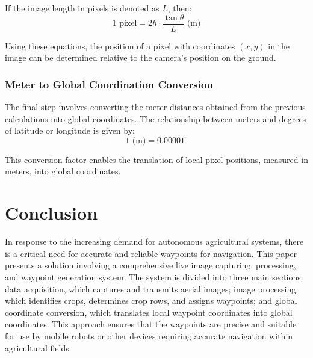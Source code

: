 \documentclass[conference]{IEEEtran}
\begin{document}
If the image length in pixels is denoted as \( L \), then:
\[
1 \text{ pixel} = 2h \cdot \frac{\tan \theta}{L} \text{ (m)}
\]

Using these equations, the position of a pixel with coordinates \((x, y)\) in the image can be determined relative to the camera's position on the ground.

\subsubsection{Meter to Global Coordination Conversion}
The final step involves converting the meter distances obtained from the previous calculations into global coordinates. The relationship between meters and degrees of latitude or longitude is given by:
\[
1 \text{ (m)} = 0.00001^\circ
\]

This conversion factor enables the translation of local pixel positions, measured in meters, into global coordinates.

\section{Conclusion}
In response to the increasing demand for autonomous agricultural systems, there is a critical need for accurate and reliable waypoints for navigation. This paper presents a solution involving a comprehensive live image capturing, processing, and waypoint generation system. The system is divided into three main sections: data acquisition, which captures and transmits aerial images; image processing, which identifies crops, determines crop rows, and assigns waypoints; and global coordinate conversion, which translates local waypoint coordinates into global coordinates. This approach ensures that the waypoints are precise and suitable for use by mobile robots or other devices requiring accurate navigation within agricultural fields.
\end{document}
